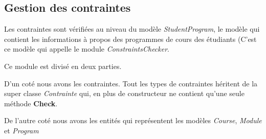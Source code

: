 
\subsection{Gestion des contraintes}
Les contraintes sont vérifiées au niveau du modèle \textit{StudentProgram}, le modèle qui contient les informations à propos des programmes de cours des étudiants (C'est ce modèle qui appelle le module \textit{ConstraintsChecker}. 

Ce module est divisé en deux parties.

D'un coté nous avons les contraintes. Tout les types de contraintes héritent de la super classe \textit{Contrainte} qui, en plus de constructeur ne contient qu'une seule méthode \textbf{Check}.

De l'autre coté nous avons les entités qui représentent les modèles \textit{Course}, \textit{Module} et \textit{Program}

